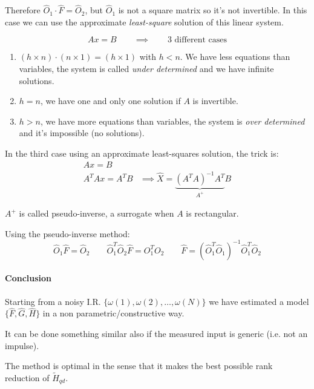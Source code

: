 Therefore $\hat{O}_1\cdot \hat{F} = \hat{O}_2$, but $\hat{O}_1$ is not a square matrix so it's not invertible.
In this case we can use the approximate \emph{least-square} solution of this linear system.

\[ Ax = B \qquad \implies \qquad \text{3 different cases} \]

\begin{enumerate}
    \item $(h\times n) \cdot (n \times 1) = (h \times 1)$ with $h < n$. We have less equations than variables, the system is called \emph{under determined} and we have infinite solutions.
    \item $h = n$, we have one and only one solution if $A$ is invertible.
    \item $h > n$, we have more equations than variables, the system is \emph{over determined} and it's impossible (no solutions).
\end{enumerate}

In the third case using an approximate least-squares solution, the trick is:
\begin{align*}
    Ax = B \\
    A^TAx = A^TB & \implies \hat{X} = \underbrace{(A^TA)^{-1}A^T}_{A^+} B
\end{align*}

$A^+$ is called pseudo-inverse, a surrogate when $A$ is rectangular.

Using the pseudo-inverse method:
\[
    \hat{O}_1\hat{F} = \hat{O}_2 \qquad \hat{O}_1^T\hat{O}_2\hat{F} = O_1^TO_2 \qquad \hat{F} = \left(\hat{O}_1^T\hat{O}_1\right)^{-1} \hat{O}_1^T\hat{O}_2
\]

\paragraph{Conclusion} Starting from a noisy I.R. $\{\omega(1), \omega(2), \ldots, \omega(N)\}$ we have estimated a model $\{\hat{F}, \hat{G}, \hat{H}\}$ in a non parametric/constructive way.

\begin{remark}
    It can be done something similar also if the measured input is generic (i.e. not an impulse).
\end{remark}

\begin{remark}
    The method is optimal in the sense that it makes the best possible rank reduction of $\tilde{H}_{qd}$.
\end{remark}

